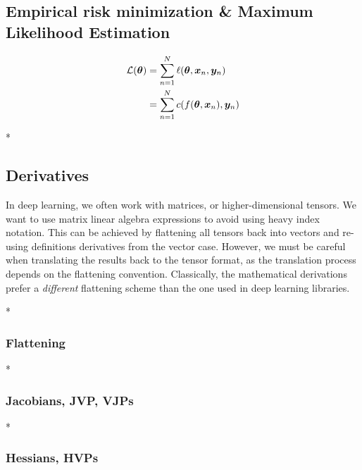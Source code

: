 \subsection{Empirical risk minimization \& Maximum Likelihood Estimation}


\begin{align}
  {\mathcal{L}}({\bm{\theta}}) &= \sum_{n=1}^N \ell({\bm{\theta}}, {\bm{x}}_n, {\bm{y}}_n)
  \\
               &=
                 \sum_{n=1}^N c(f({\bm{\theta}}, {\bm{x}}_n), {\bm{y}}_n)
\end{align}

\switchcolumn[0]

\blindtext

\switchcolumn[1]

\switchcolumn[0]* %

\blindtext

\subsection{Derivatives}

\begin{caveat}
  In deep learning, we often work with matrices, or higher-dimensional tensors.
  We want to use matrix linear algebra expressions to avoid using heavy index notation.
  This can be achieved by flattening all tensors back into vectors and re-using definitions derivatives from the vector case.
  However, we must be careful when translating the results back to the tensor format, as the translation process depends on the flattening convention.
  Classically, the mathematical derivations prefer a \emph{different} flattening scheme than the one used in deep learning libraries.
\end{caveat}

\switchcolumn[0]*
\subsubsection{Flattening}


\switchcolumn[0]*
\subsubsection{Jacobians, JVP, VJPs}


\switchcolumn[0]*
\subsubsection{Hessians, HVPs}


